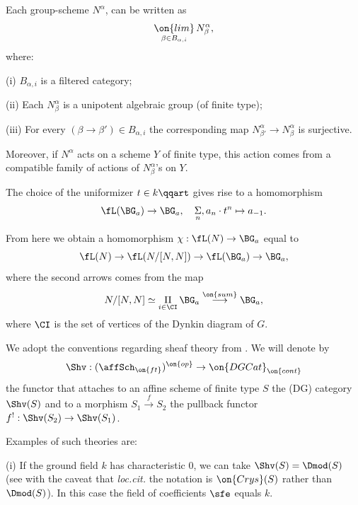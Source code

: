 \documentclass[9pt]{amsart}
\theoremstyle{definition}
\theoremstyle{remark}
\numberwithin{equation}{section}
\begin{document}
 \medskip

Each group-scheme $N^\alpha$, can be written as
\begin{equation} \label{e:arc N as lim}
\underset{\beta\in B_{\alpha,i}}{\on{lim}}\, N^\alpha_\beta,
\end{equation} 
where:

\medskip

\noindent(i) $B_{\alpha,i}$ is a filtered category;

\smallskip

\noindent(ii) Each $N^\alpha_\beta$ is a unipotent algebraic group (of finite type);

\smallskip

\noindent(iii) For every $(\beta\to \beta')\in B_{\alpha,i}$ the corresponding map
$N^\alpha_{\beta'}\to N^\alpha_\beta$
is surjective. 

\medskip

Moreover, if $N^\alpha$ acts on a scheme $Y$ of finite type, this action 
comes from a compatible family of actions of $N^\alpha_\beta$'s on $Y$.

\sssec{}

The choice of the uniformizer $t\in k\qqart$ gives rise to a homomorphism
$$\fL(\BG_a)\to \BG_a, \quad \underset{n}\Sigma, a_n\cdot t^n\mapsto a_{-1}.$$

From here we obtain a homomorphism $\chi:\fL(N)\to \BG_a$
equal to
$$\fL(N) \to \fL(N/[N,N])\to \fL(\BG_a)\to \BG_a,$$
where the second arrows comes from the map
$$N/[N,N]\simeq \underset{i\in \CI}\Pi\, \BG_a \overset{\on{sum}}\longrightarrow \BG_a,$$
where $\CI$ is the set of vertices of the Dynkin diagram of $G$.


\sssec{}  \label{sss:shvs}

We adopt the conventions regarding sheaf theory from \cite{Ga6}.  We will denote by
\begin{equation} \label{e:Shv}
\Shv:(\affSch_{\on{ft}})^{\on{op}}\to \on{DGCat}_{\on{cont}}
\end{equation} 
the functor that attaches to an affine scheme of finite type $S$ the (DG) category $\Shv(S)$ and to a morphism
$S_1\overset{f}\to S_2$ the pullback functor $f^!:\Shv(S_2)\to \Shv(S_1)$.

\medskip

Examples of such theories are:

\smallskip

\noindent(i) If the ground field $k$ has characteristic $0$, we can take $\Shv(S)=\Dmod(S)$ (see \cite[Chapter 4, Sect. 1.2]{GR2}
with the caveat that {\it loc.cit.} the notation is $\on{Crys}(S)$ rather than $\Dmod(S)$). In this case the field of coefficients $\sfe$ 
equals $k$. 
\end{document}
